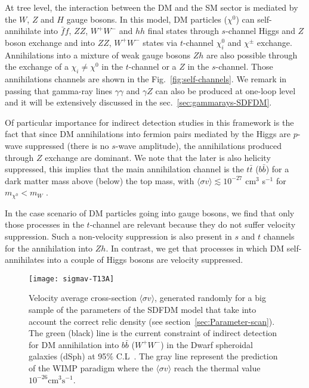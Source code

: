 At tree level, the interaction between the DM and the SM sector is mediated by the $W$, $Z$ and $H$ gauge bosons.
In this model, DM particles ($\chi^0$) can self-annihilate into $\bar{f}f$, $ZZ$, $W^+W^-$ and $hh$ final states through  $s$-channel Higgs and $Z$ boson exchange and into $ZZ$, $W^+W^-$ states via $t$-channel $\chi_i^0$ and $\chi^{\pm}$ exchange. Annihilations into a mixture of weak gauge bosons $Zh$ are also possible through the exchange of a $\chi_i\neq\chi^0$  in the $t$-channel or a $Z$ in the $s$-channel. Those annihilations channels are shown in the Fig.~\ref{fig:self-channels}.  We remark in passing that gamma-ray lines $\gamma\gamma$ and $\gamma Z$ can also be produced at one-loop level and it will be extensively discussed in the sec.~\ref{sec:gammarays-SDFDM}. 

Of particular importance for indirect detection studies in this framework is the fact that since DM annihilations into fermion pairs mediated by the Higgs are $p$-wave suppressed (there is no $s$-wave amplitude), the annihilations produced through $Z$ exchange are dominant. We note that the later is also helicity suppressed, this implies that the main annihilation channel is the $t\bar{t}$ ($b\bar{b}$) for a dark matter mass above (below) the top mass, with $\langle\sigma v \rangle\lesssim 10^{-27}$ cm$^3$ s$^{-1}$ for $m_{\chi^0}<m_W$ \cite{Calibbi:2015nha}. 

In the case scenario of DM particles going into gauge bosons, we find that only those processes in the $t$-channel are relevant because they do not suffer velocity suppression. Such a non-velocity suppression is also present in $s$ and $t$ channels for the annihilation into $Zh$. 
In contrast, we get that processes in which DM self-annihilates into a couple of Higgs bosons are velocity suppressed. 

\begin{figure}[h]
\begin{center}
\texttt{[image: sigmav-T13A]}
\end{center}
\caption{Velocity average cross-section $\langle\sigma v\rangle$, generated randomly for a big sample of the parameters of the SDFDM model that take into account the correct relic density (see section~\ref{sec:Parameter-scan}). The green (black) line is the current constraint of indirect detection for DM annihilation into $b\bar{b}$ ($W^+W^-$) in the Dwarf spheroidal galaxies (dSph) at 95$\%$ C.L~\cite{Ackermann:2015zua}. The gray line represent the prediction of the WIMP paradigm where the $\langle\sigma v\rangle$ reach the thermal value $10^{-26}\text{cm}^{3}\text{s}^{-1}$.}
\label{fig:sigmav-random}
\end{figure}

